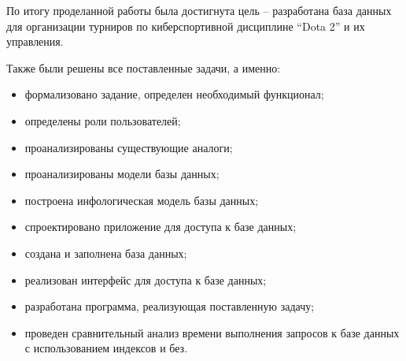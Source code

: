 
По итогу проделанной работы была достигнута цель – разработана база данных для организации турниров по киберспортивной дисциплине “Dota 2” и их управления.

Также были решены все поставленные задачи, а именно:
\begin{itemize}
	\item формализовано задание, определен необходимый функционал;
	\item определены роли пользователей;
	\item проанализированы существующие аналоги;
	\item проанализированы модели базы данных;
	\item построена инфологическая модель базы данных;
	\item спроектировано приложение для доступа к базе данных;
	\item создана и заполнена база данных;
	\item реализован интерфейс для доступа к базе данных;
	\item разработана программа, реализующая поставленную задачу;
	\item проведен сравнительный анализ времени выполнения запросов к базе данных с использованием индексов и без.
\end{itemize}